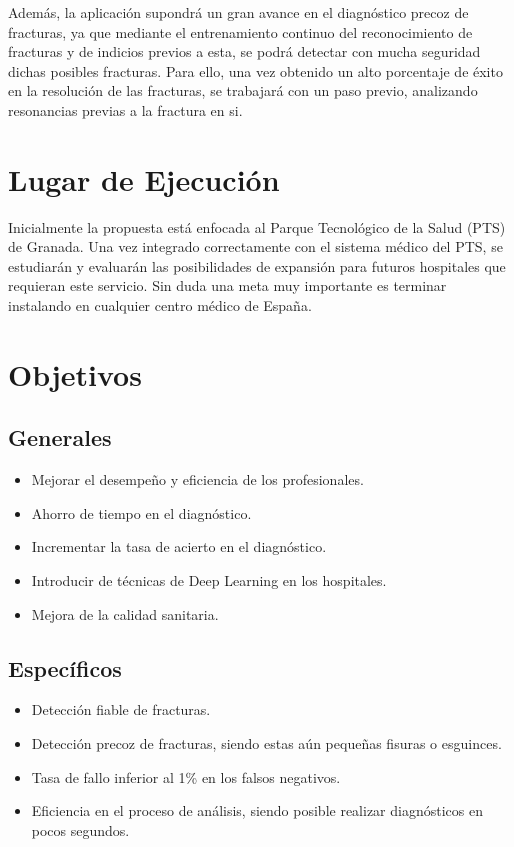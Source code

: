 Además, la aplicación supondrá un gran avance en el diagnóstico precoz de fracturas, ya que mediante el entrenamiento continuo del reconocimiento de fracturas y de indicios previos a esta, se podrá detectar con mucha seguridad dichas posibles fracturas. Para ello, una vez obtenido un alto porcentaje de éxito en la resolución de las fracturas, se trabajará con un paso previo, analizando resonancias previas a la fractura en si. 

\section{Lugar de Ejecución}

Inicialmente la propuesta está enfocada al Parque Tecnológico de la Salud (PTS) de Granada. Una vez integrado correctamente con el sistema médico del PTS, se estudiarán y evaluarán las posibilidades de expansión para futuros hospitales que requieran este servicio. Sin duda una meta muy importante es terminar instalando en cualquier centro médico de España.

\section{Objetivos}
\subsection{Generales} 
\begin{itemize}
	\item Mejorar el desempeño y eficiencia de los profesionales.
	\item Ahorro de tiempo en el diagnóstico.
	\item Incrementar la tasa de acierto en el diagnóstico.
	\item Introducir de técnicas de Deep Learning en los hospitales.
	\item Mejora de la calidad sanitaria.
\end{itemize}

\subsection{Específicos}
\begin{itemize}
	\item Detección fiable de fracturas.
	\item Detección precoz de fracturas, siendo estas aún pequeñas fisuras o esguinces.
	\item Tasa de fallo inferior al 1\% en los falsos negativos.
	\item Eficiencia en el proceso de análisis, siendo posible realizar diagnósticos en pocos segundos.
\end{itemize}

